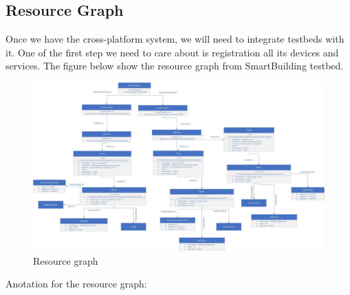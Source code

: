 \documentclass[runningheads,a4paper]{llncs}
\begin{document}
\subsection{Resource Graph}
Once we have the cross-platform system, we will need to integrate testbeds with it. One of the first step we need to care about is registration all its devices and services. The figure below show the resource graph from SmartBuilding testbed. \\

\begin{figure}[H]
\centering
\includegraphics[scale=0.2]{resource_graph} 
\caption{Resource graph}
\end{figure} 

Anotation for the resource graph: \\
\end{document}
